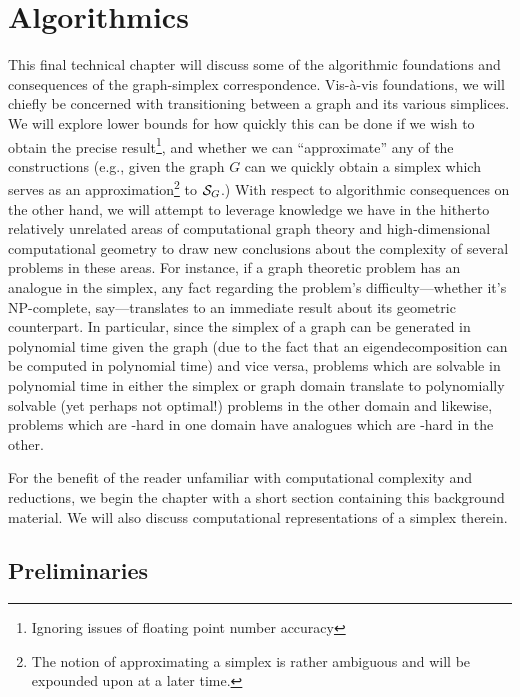 \chapter{Algorithmics}
\label{chap:algorithmics}



This final technical chapter will discuss some of the algorithmic foundations and consequences of the graph-simplex correspondence. Vis-\`{a}-vis foundations, we will chiefly be concerned with transitioning between a graph and its various simplices. We will explore lower bounds for how quickly this can be done if we wish to obtain the precise result\footnote{Ignoring issues of floating point number accuracy}, and whether we can ``approximate'' any of the constructions (e.g., given the graph $G$ can we quickly obtain a simplex which serves as an approximation\footnote{The notion of approximating a simplex is rather ambiguous and will be expounded upon at a later time.} to $\mathcal{S}_G$.) With respect to algorithmic consequences on the other hand, we will attempt to leverage knowledge we have in the hitherto relatively unrelated areas of computational graph theory and high-dimensional computational geometry to draw new conclusions about the complexity of several problems in these areas. For instance, if a  graph theoretic problem has an analogue in the simplex, any fact regarding the problem's difficulty---whether it's NP-complete, say---translates to an immediate result about its geometric counterpart. In particular, since the simplex of a graph can be generated in polynomial time given the graph (due to the fact that an eigendecomposition can be computed in polynomial time) and vice versa, problems which are solvable in polynomial time in either the simplex or graph domain  translate to polynomially solvable (yet perhaps not optimal!) problems in the other domain and likewise, problems which are \NP-hard in one domain have analogues which are \NP-hard in the other. 

For the benefit of the reader unfamiliar with computational complexity and reductions, we begin the chapter with a short section containing this background material. We will also discuss computational representations of a simplex therein. 

\section{Preliminaries}
\label{sec:algorithmics_prelims}
